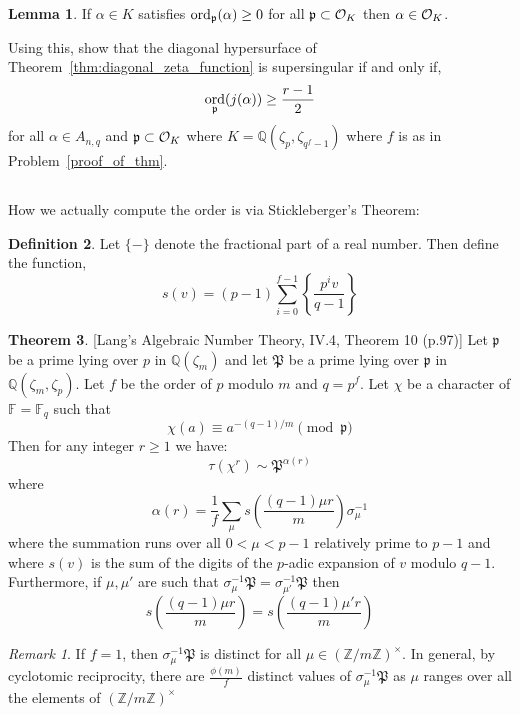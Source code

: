 \documentclass[12pt]{article}
\DeclareMathOperator{\ord}{\mathrm{ord}}
\newcommand{\Z}{\mathbb{Z}}
\newcommand{\Q}{\mathbb{Q}}
\newcommand{\FF}{\mathbb{F}}
\theoremstyle{remark}
\newtheorem*{remark}{Remark}
\theoremstyle{definition}
\newtheorem{theorem}{Theorem}[subsection]
\newtheorem{lemma}[theorem]{Lemma}
\newtheorem{defn}[theorem]{Definition}
\begin{document}
\begin{lemma}
If $\alpha \in K$ satisfies $\ord_{\p}(\alpha) \ge 0$ for all $\mathfrak{p} \subset \mathcal{O}_{K}$ then $\alpha \in \mathcal{O}_{K}$.
\end{lemma}

Using this, show that the diagonal hypersurface of Theorem~\ref{thm:diagonal_zeta_function} is supersingular if and only if,
\[ \ord_{\p}(j(\alpha)) \ge \frac{r-1}{2} \]
for all $\alpha \in A_{n, q}$ and $\mathfrak{p} \subset \mathcal{O}_{K}$ where $K = \Q(\zeta_p, \zeta_{q^f-1})$ where $f$ is as in Problem~\ref{proof_of_thm}.

\subsection{}

How we actually compute the order is via Stickleberger's Theorem:


\begin{defn}
Let $\{ - \}$ denote the fractional part of a real number. Then define the function,
\[ s\left( v \right) = (p-1) \sum_{i = 0}^{f-1} \left\{ \frac{p^i v}{q - 1} \right\} \]
\end{defn}


\begin{theorem} \label{thm:gauss_fact_lang}[Lang's Algebraic Number Theory, IV.4, Theorem 10 (p.97)]
Let $\mathfrak{p}$ be a prime lying over $p$ in $\Q(\zeta_{m})$ and let $\mathfrak{P}$ be a prime lying over $\mathfrak{p}$ in $\mathbb{Q}(\zeta_{m}, \zeta_p)$. Let $f$ be the order of $p$ modulo $m$ and $q = p^f$. Let $\chi$ be a character of $\FF = \FF_q$ such that
\[\chi(a) \equiv a^{-(q-1)/m} \pmod{\mathfrak{p}}\]
Then for any integer $r \ge 1$ we have:
\[\tau\left(\chi^r\right) \sim \mathfrak{P}^{\alpha(r)}\]
where 
\[\alpha(r) = \frac{1}{f}\sum_{\mu} s\left(\frac{(q-1)\mu r}{m}\right)\sigma_{\mu}^{-1}\]
where the summation runs over all $0 < \mu < p-1$ relatively prime to $p-1$ and where $s(v)$ is the sum of the digits of the $p$-adic expansion of $v$ modulo $q - 1$. Furthermore, if $\mu, \mu'$ are such that $\sigma_{\mu}^{-1}\mathfrak{P} = \sigma_{\mu'}^{-1}\mathfrak{P}$ then
\[s\left(\frac{(q-1)\mu r}{m}\right) = s\left(\frac{(q-1)\mu' r}{m}\right)\]
\end{theorem}


\begin{remark} If $f = 1$, then $\sigma_{\mu}^{-1} \mathfrak{P}$ is distinct for all $\mu\in(\Z/m\Z)^{\times}$. In general, by cyclotomic reciprocity, there are $\frac{\phi(m)}{f}$ distinct values of $\sigma_{\mu}^{-1} \mathfrak{P}$ as $\mu$ ranges over all the elements of $(\Z/m\Z)^{\times}$
\end{remark}
\end{document}
